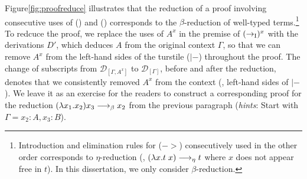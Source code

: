 Figure\;\ref{fig:proofreduce} illustrates that
the reduction of a proof involving consecutive uses of
() and ()
corresponds to the $\beta$-reduction of well-typed terms.\footnote{
	Introduction and elimination rules for ($->$) consecutively used
	in the other order corresponds to $\eta$-reduction
	(\ie, $(\lambda x. t\;x) -->_\eta t$ where $x$ does not appear free in $t$).
	In this dissertation, we only consider $\beta$-reduction.}
To redcuce the proof, we replace the uses of $A^x$ in the premise of
$(->_\textsc{I})^x$ with the derivations $D'$, which deduces $A$ from
the original context $\Gamma$, so that we can remove $A^x$ from
the left-hand sides of the turstile ($|-$) throughout the proof.
The change of subscripts from $\mathcal{D}_{[\Gamma,A^x]}$ to
$\mathcal{D}_{[\Gamma]}$, before and after the reduction,
denotes that we consistently removed $A^x$ from the context
(\ie, left-hand sides of $|-$). We leave it as an exercise for
the readers to construct a corresponding proof for the reduction
$(\lambda x_1.x_2) x_3 -->_\beta x_2$ from the previous paragraph
(\textit{hints}: Start with $\Gamma = x_2:A,x_3:B$).

